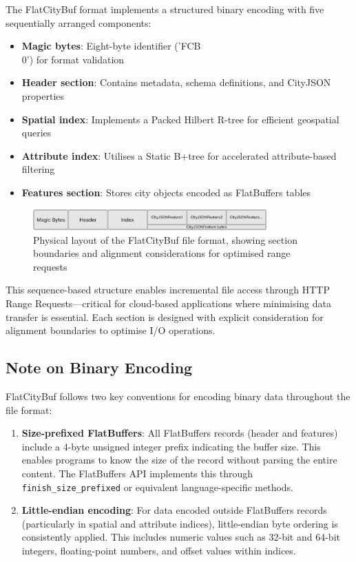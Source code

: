 The FlatCityBuf format implements a structured binary encoding with five sequentially arranged components:

\begin{itemize}
    \item \textbf{Magic bytes}: Eight-byte identifier ('FCB\\0') for format validation
    \item \textbf{Header section}: Contains metadata, schema definitions, and CityJSON properties
    \item \textbf{Spatial index}: Implements a Packed Hilbert R-tree for efficient geospatial queries
    \item \textbf{Attribute index}: Utilises a Static B+tree for accelerated attribute-based filtering
    \item \textbf{Features section}: Stores city objects encoded as FlatBuffers tables
\end{itemize}

\begin{figure}[h]
  \centering
  \includegraphics[width=0.8\textwidth]{figs/methodology/file_structure.png}
  \caption{Physical layout of the FlatCityBuf file format, showing section boundaries and alignment considerations for optimised range requests}
  \label{fig:methodology:file-structure}
\end{figure}

This sequence-based structure enables incremental file access through HTTP Range Requests—critical for cloud-based applications where minimising data transfer is essential. Each section is designed with explicit consideration for alignment boundaries to optimise I/O operations.

\subsection{Note on Binary Encoding}
\label{methodology:overview:note_on_binary_encoding}
FlatCityBuf follows two key conventions for encoding binary data throughout the file format:

\begin{enumerate}
    \item \textbf{Size-prefixed FlatBuffers}: All FlatBuffers records (header and features) include a 4-byte unsigned integer prefix indicating the buffer size. This enables programs to know the size of the record without parsing the entire content. The FlatBuffers API implements this through \texttt{finish\_size\_prefixed} or equivalent language-specific methods.

    \item \textbf{Little-endian encoding}: For data encoded outside FlatBuffers records (particularly in spatial and attribute indices), little-endian byte ordering is consistently applied. This includes numeric values such as 32-bit and 64-bit integers, floating-point numbers, and offset values within indices.
\end{enumerate}

